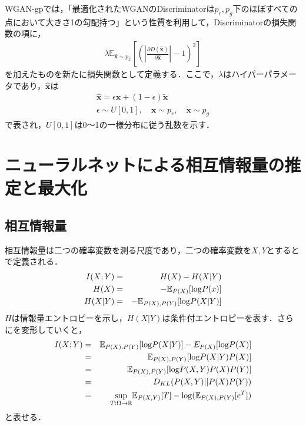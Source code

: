 WGAN-gpでは，「最適化されたWGANのDiscriminatorは$p_r, p_g$下のほぼすべての点において大きさ1の勾配持つ」という性質を利用して，Discriminatorの損失関数の項に，
\begin{gather}
	\lambda \mathbb E_{\bm{\hat x} \sim p_{\hat x}}[(|\frac{\partial D(\bm{\hat x})}{\partial \bm{\hat x}}| - 1)^2]\nonumber
\end{gather}
を加えたものを新たに損失関数として定義する．ここで，$\lambda$はハイパーパラメータであり，$\bm{\hat  x}$は
\begin{gather}
	\bm{\hat x} = \epsilon \bm x + (1 - \epsilon) \bm{\tilde x} \nonumber \\
	\epsilon \sim U[0, 1], \quad  \bm x \sim p_r, \quad \bm{\tilde x} \sim p_g \nonumber
\end{gather}
で表され，$U[0, 1]$は0～1の一様分布に従う乱数を示す．


\newpage
\section{ニューラルネットによる相互情報量の推定と最大化}
\subsection{相互情報量}
相互情報量は二つの確率変数を測る尺度であり，二つの確率変数を$X,Y$とすると で定義される．
\begin{eqnarray}
	I(X;Y) &=& H(X) - H(X|Y) \label{eq:mutual-information}\\
	H(X) &=& -\mathbb E_{P(X)}[{\rm log}P(x)] \nonumber \\
	H(X|Y) &=& -\mathbb E_{P(X), P(Y)}[{\rm log}P(X|Y)] \nonumber
\end{eqnarray}
$H$は情報量エントロピーを示し，$H(X|Y)$は条件付エントロピーを表す．さらにを変形していくと，
\begin{eqnarray}
	I(X;Y) &=& \mathbb E_{P(X), P(Y)}[{\rm log}P(X|Y)] - E_{P(X)}[{\rm log}P(X)] \nonumber \\
	&=& \mathbb E_{P(X), P(Y)}[{\rm log}P(X|Y)P(X)] \nonumber \\
	&=& \mathbb E_{P(X), P(Y)}[{\rm log}P(X, Y)P(X)P(Y)] \nonumber \\
	&=& D_{KL}(P(X, Y)||P(X)P(Y)) \nonumber \\
	&=& \underset{T:\Omega \rightarrow \mathbb R}{\rm sup}\mathbb E_{P(X,Y)}[T] - {\rm log}(\mathbb E_{P(X), P(Y)}[e^T]) \label{eq:mutual_estimation}
\end{eqnarray}
と表せる．

